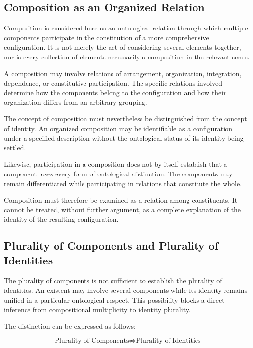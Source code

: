 \subsection{Composition as an Organized Relation}

Composition is considered here as an ontological relation
through which multiple components participate in the
constitution of a more comprehensive configuration.
It is not merely the act of considering several elements
together, nor is every collection of elements necessarily
a composition in the relevant sense.

A composition may involve relations of arrangement,
organization, integration, dependence, or constitutive
participation. The specific relations involved determine
how the components belong to the configuration and how
their organization differs from an arbitrary grouping.

The concept of composition must nevertheless be distinguished
from the concept of identity. An organized composition
may be identifiable as a configuration under a specified
description without the ontological status of its identity
being settled.

Likewise, participation in a composition does not by itself
establish that a component loses every form of ontological
distinction. The components may remain differentiated
while participating in relations that constitute the whole.

Composition must therefore be examined as a relation
among constituents. It cannot be treated, without further
argument, as a complete explanation of the identity
of the resulting configuration.

\subsection{Plurality of Components and Plurality of Identities}

The plurality of components is not sufficient to establish
the plurality of identities. An existent may involve
several components while its identity remains unified
in a particular ontological respect. This possibility
blocks a direct inference from compositional multiplicity
to identity plurality.

The distinction can be expressed as follows:

\[
\text{Plurality of Components}
\not\Rightarrow
\text{Plurality of Identities}
\]

